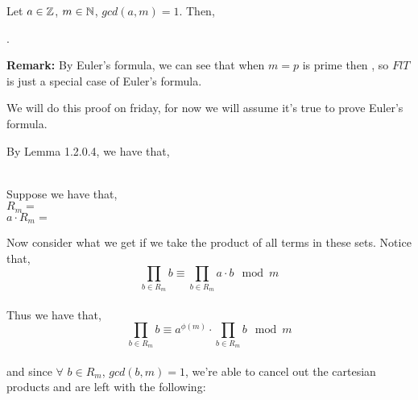 \documentclass[main.tex]{subfiles}
\begin{document}
\begin{thm}
    Let $a \in \mathbb{Z}$, $m \in \mathbb{N}$, $gcd(a,m)=1$. Then, \\
    \centerline{.}
\end{thm}
\textbf{Remark:} By Euler's formula, we can see that when $m=p$ is prime then , so $FlT$ is just a special case of Euler's formula.
\begin{lem}
\end{lem}
\begin{pf}[Lemma 1.2.0.4]
    We will do this proof on friday, for now we will assume it's true to prove Euler's formula.
\end{pf}
\begin{pf}
    By Lemma 1.2.0.4, we have that, \\
    \begin{center}
         \\
        Suppose we have that, \\
        $R_m=$  \\
        $a \cdot R_m=$  \\
    \end{center}
    Now consider what we get if we take the product of all terms in these sets. Notice that,
    $$\prod_{b \in R_m} b \equiv \prod_{b \in R_m} a \cdot b \mod{m}$$ \\
    Thus we have that,
    $$\prod_{b \in R_m} b \equiv a^{\phi(m)} \cdot \prod_{b \in R_m} b \mod{m}$$ \\
    and since $\forall$ $b \in R_m$, $gcd(b,m)=1$, we're able to cancel out the cartesian products and are left with the following:
    \begin{center}
    \end{center}
\end{pf}
\end{document}
